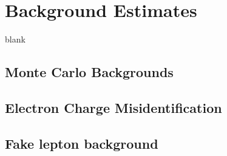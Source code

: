 \section{Background Estimates}
\label{sec:bg_estimates}
blank

\subsection{Monte Carlo Backgrounds}
\label{sec:mcbg}
%
\subsection{Electron Charge Misidentification}
\label{sec:charge_misid}
%  
\subsection{Fake lepton background}
\label{sec:bg_fake}
%
